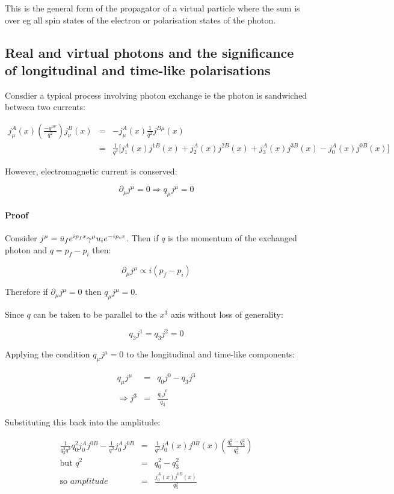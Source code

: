 This is the general form of the propagator of a virtual particle where the sum is over eg all spin states of the electron or polarisation states of the photon.

\subsection{Real and virtual photons and the significance of longitudinal and time-like polarisations}

Consdier a typical process involving photon exchange ie the photon is sandwiched between two currents:

\begin{eqnarray*}
  j^A_{\mu}(x)\left(\frac{-g^{\mu\nu}}{q^2}\right)j^B_{\nu}(x) & = & -j^A_{\mu}(x)\frac{1}{q^2}j^{B\mu}(x) \\
  & = & \frac{1}{q^2}\Big[j^A_1(x)j^{1B}(x) + j^A_2(x)j^{2B}(x) + j^A_3(x)j^{3B}(x) - j^A_0(x)j^{0B}(x) \Big]
\end{eqnarray*}

However, electromagnetic current is conserved:

\[
  \partial_{\mu}j^{\mu} = 0 \Rightarrow q_{\mu}j^{\mu} = 0
\]

\paragraph*{Proof} Consider $j^{\mu} = \bar{u}_fe^{ip_fx}\gamma^{\mu}u_ie^{-ip_ix}$.  Then if $q$ is the momentum of the exchanged photon and $q = p_f - p_i$ then:

\[
  \partial_{\mu}j^{\mu} \propto i\left(p_f - p_i\right)
\]

Therefore if $\partial_{\mu}j^{\mu} = 0$ then $q_{\mu}j^{\mu} = 0$.

Since $q$ can be taken to be parallel to the $x^3$ axis without loss of generality:

\[
  q_3j^1 = q_3j^2 = 0
\]

Applying the condition $q_{\mu}j^{\mu} = 0$ to the longitudinal and time-like components:

\begin{eqnarray*}
  q_{\mu}j^{\mu} & = & q_0j^0 - q_3j^3 \\
  \Rightarrow j^3 & =& \frac{q_0j^0}{q_3}
\end{eqnarray*}

Substituting this back into the amplitude:

\begin{eqnarray*}
  \frac{1}{q_3^2q^2}q_0^2j^A_0j^{0B} - \frac{1}{q^2}j^A_0j^{0B} & = & \frac{1}{q^2}j^A_0(x)j^{0B}(x)\left(\frac{q_0^2 - q_3^2}{q_3^2}\right) \\
  \textrm{but } q^2 & = & q_0^2 - q_3^2 \\
  \textrm{so } amplitude & = & \frac{j_0^A(x)j^{0B}(x)}{q_3^2}
\end{eqnarray*}


